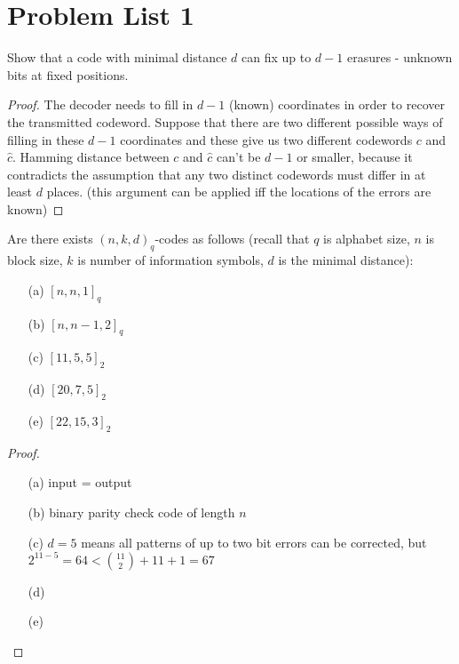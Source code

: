 \section{Problem List 1}


\begin{prob}
    Show that a code with minimal distance $d$ can fix up to $d-1$ erasures - unknown bits at fixed positions.
\end{prob}

\begin{proof}
    The decoder needs to fill in $d-1$ (known) coordinates in order to recover the transmitted codeword. Suppose that there are two different possible ways of filling in these $d-1$ coordinates and these give us two different codewords $c$ and $\hat{c}$. Hamming distance between $c$ and $\hat{c}$ can't be $d-1$ or smaller, because it contradicts the assumption that any two distinct codewords must differ in at least $d$ places. (this argument can be applied iff the locations of the errors are known)
\end{proof}
\vskip 0.4in





\begin{prob}
    Are there exists $(n, k, d)_q$-codes as follows (recall that $q$ is alphabet size, $n$ is block size, $k$ is number of information symbols, $d$ is the minimal distance):
    \begin{itemize}
    \item[(a)] $[n, n, 1]_q$
    \item[(b)] $[n, n-1,2]_q$
    \item[(c)] $[11,5,5]_2$
    \item[(d)] $[20,7,5]_2$
    \item[(e)] $[22,15,3]_2$
    \end{itemize}
\end{prob}

\begin{proof}
    \begin{itemize}
    \item[(a)] input = output
    \item[(b)] binary parity check code of length $n$
    \item[(c)] $d = 5$ means all patterns of up to two bit errors can be corrected, but $2^{11-5} = 64 < {{11} \choose {2}} + 11 + 1 = 67$
    \item[(d)] 
    \item[(e)] 
    \end{itemize}
\end{proof}
\vskip 0.4in





